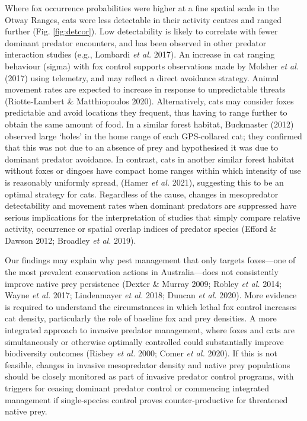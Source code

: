 \documentclass[preprint, 3p, authoryear]{elsarticle} %
\begin{document}
Where fox occurrence probabilities were higher at a fine spatial scale in the Otway Ranges, cats were less detectable in their activity centres and ranged further (Fig. \ref{fig:detcor}). Low detectability is likely to correlate with fewer dominant predator encounters, and has been observed in other predator interaction studies (e.g., Lombardi \emph{et al.} 2017). An increase in cat ranging behaviour (sigma) with fox control supports observations made by Molsher \emph{et al.} (2017) using telemetry, and may reflect a direct avoidance strategy. Animal movement rates are expected to increase in response to unpredictable threats (Riotte-Lambert \& Matthiopoulos 2020). Alternatively, cats may consider foxes predictable and avoid locations they frequent, thus having to range further to obtain the same amount of food. In a similar forest habitat, Buckmaster (2012) observed large `holes' in the home range of each GPS-collared cat; they confirmed that this was not due to an absence of prey and hypothesised it was due to dominant predator avoidance. In contrast, cats in another similar forest habitat without foxes or dingoes have compact home ranges within which intensity of use is reasonably uniformly spread, (Hamer \emph{et al.} 2021), suggesting this to be an optimal strategy for cats. Regardless of the cause, changes in mesopredator detectability and movement rates when dominant predators are suppressed have serious implications for the interpretation of studies that simply compare relative activity, occurrence or spatial overlap indices of predator species (Efford \& Dawson 2012; Broadley \emph{et al.} 2019).

Our findings may explain why pest management that only targets foxes---one of the most prevalent conservation actions in Australia---does not consistently improve native prey persistence (Dexter \& Murray 2009; Robley \emph{et al.} 2014; Wayne \emph{et al.} 2017; Lindenmayer \emph{et al.} 2018; Duncan \emph{et al.} 2020). More evidence is required to understand the circumstances in which lethal fox control increases cat density, particularly the role of baseline fox and prey densities. A more integrated approach to invasive predator management, where foxes and cats are simultaneously or otherwise optimally controlled could substantially improve biodiversity outcomes (Risbey \emph{et al.} 2000; Comer \emph{et al.} 2020). If this is not feasible, changes in invasive mesopredator density and native prey populations should be closely monitored as part of invasive predator control programs, with triggers for ceasing dominant predator control or commencing integrated management if single-species control proves counter-productive for threatened native prey.
\end{document}
